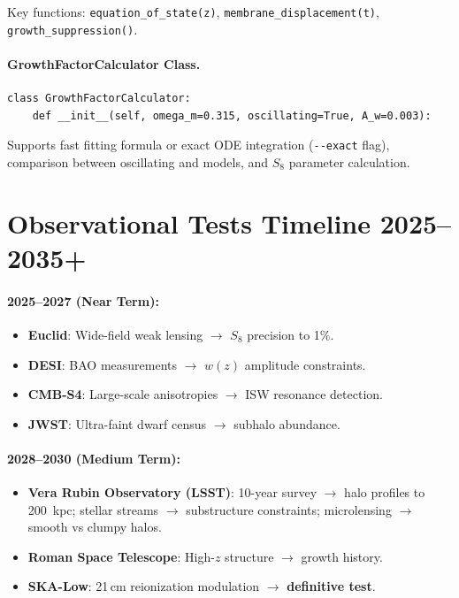 Key functions: \texttt{equation\_of\_state(z)}, \texttt{membrane\_displacement(t)}, \texttt{growth\_suppression()}.

\paragraph{GrowthFactorCalculator Class.}
\begin{verbatim}
class GrowthFactorCalculator:
    def __init__(self, omega_m=0.315, oscillating=True, A_w=0.003):
\end{verbatim}

Supports fast fitting formula or exact ODE integration (\texttt{-{}-exact} flag), comparison between oscillating and \LCDM{} models, and $S_8$ parameter calculation.

\section{Observational Tests Timeline 2025--2035+}
\label{sec:obs_timeline}

\paragraph{2025--2027 (Near Term):}
\begin{itemize}
  \item \textbf{Euclid}: Wide-field weak lensing $\to$ $S_8$ precision to 1\%.
  \item \textbf{DESI}: BAO measurements $\to$ $w(z)$ amplitude constraints.
  \item \textbf{CMB-S4}: Large-scale anisotropies $\to$ ISW resonance detection.
  \item \textbf{JWST}: Ultra-faint dwarf census $\to$ subhalo abundance.
\end{itemize}

\paragraph{2028--2030 (Medium Term):}
\begin{itemize}
  \item \textbf{Vera Rubin Observatory (LSST)}: 10-year survey $\to$ halo profiles to 200~kpc; stellar streams $\to$ substructure constraints; microlensing $\to$ smooth vs clumpy halos.
  \item \textbf{Roman Space Telescope}: High-$z$ structure $\to$ growth history.
  \item \textbf{SKA-Low}: 21\,cm reionization modulation $\to$ \textbf{definitive test}.
\end{itemize}

